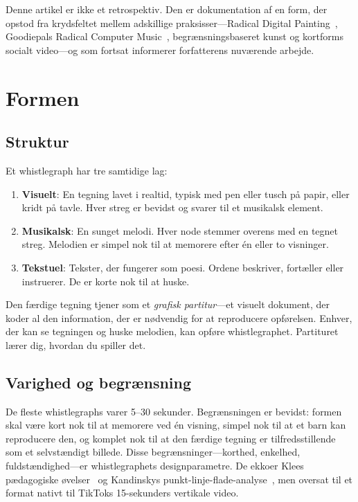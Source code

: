 \documentclass[10pt,letterpaper,twocolumn]{article}
\begin{document}
Denne artikel er ikke et retrospektiv. Den er dokumentation af en form, der opstod fra krydsfeltet mellem adskillige praksisser---Radical Digital Painting~\citep{scudder2017manifesto}, Goodiepals Radical Computer Music~\citep{goodiepal2012elcamino}, begrænsningsbaseret kunst og kortforms socialt video---og som fortsat informerer forfatterens nuværende arbejde.

\section{Formen}

\subsection{Struktur}

Et whistlegraph har tre samtidige lag:

\begin{enumerate}
  \item \textbf{Visuelt}: En tegning lavet i realtid, typisk med pen eller tusch på papir, eller kridt på tavle. Hver streg er bevidst og svarer til et musikalsk element.
  \item \textbf{Musikalsk}: En sunget melodi. Hver node stemmer overens med en tegnet streg. Melodien er simpel nok til at memorere efter én eller to visninger.
  \item \textbf{Tekstuel}: Tekster, der fungerer som poesi. Ordene beskriver, fortæller eller instruerer. De er korte nok til at huske.
\end{enumerate}

Den færdige tegning tjener som et \emph{grafisk partitur}---et visuelt dokument, der koder al den information, der er nødvendig for at reproducere opførelsen. Enhver, der kan se tegningen og huske melodien, kan opføre whistlegraphet. Partituret lærer dig, hvordan du spiller det.

\subsection{Varighed og begrænsning}

De fleste whistlegraphs varer 5--30 sekunder. Begrænsningen er bevidst: formen skal være kort nok til at memorere ved én visning, simpel nok til at et barn kan reproducere den, og komplet nok til at den færdige tegning er tilfredsstillende som et selvstændigt billede. Disse begrænsninger---korthed, enkelhed, fuldstændighed---er whistlegraphets designparametre. De ekkoer Klees pædagogiske øvelser~\citep{klee1925pedagogical} og Kandinskys punkt-linje-flade-analyse~\citep{kandinsky1926point}, men oversat til et format nativt til TikToks 15-sekunders vertikale video.
\end{document}
